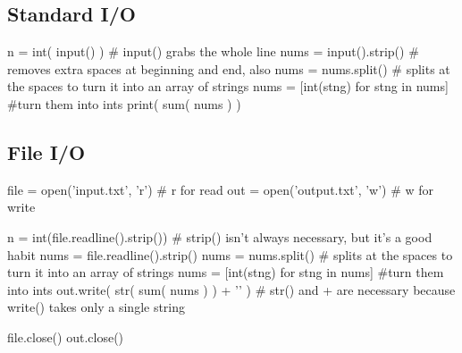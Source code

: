 \subsection{Standard I/O}

\begin{mylstlisting}
n = int( input() ) # input() grabs the whole line
nums = input().strip() # removes extra spaces at beginning and end, also \n
nums = nums.split() # splits at the spaces to turn it into an array of strings
nums = [int(stng) for stng in nums] #turn them into ints
print( sum( nums ) )
\end{mylstlisting}

\subsection{File I/O}

\begin{mylstlisting}
file = open('input.txt', 'r') # r for read
out = open('output.txt', 'w') # w for write

n = int(file.readline().strip()) # strip() isn't always necessary, but it's a good habit
nums = file.readline().strip()
nums = nums.split() # splits at the spaces to turn it into an array of strings
nums = [int(stng) for stng in nums] #turn them into ints
out.write( str( sum( nums ) ) + '\n' ) # str() and + are necessary because write() takes only a single string

file.close()
out.close()
\end{mylstlisting}